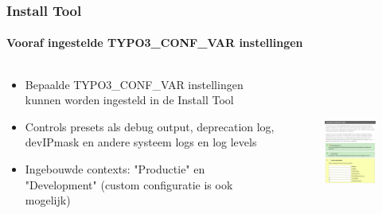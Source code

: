 \begin{frame}[fragile]
	\frametitle{Install Tool}
	\framesubtitle{Vooraf ingestelde TYPO3\_CONF\_VAR instellingen}

	\begin{columns}[T]
		\begin{column}{.5\textwidth}

			\begin{itemize}
				\item Bepaalde TYPO3\_CONF\_VAR instellingen kunnen worden ingesteld in de Install Tool
				\item Controls presets als debug output, deprecation log, devIPmask en andere systeem logs en log levels
				\item Ingebouwde contexts: "Productie" en "Development"\newline
					(custom configuratie is ook mogelijk)
			\end{itemize}

		\end{column}
		\begin{column}{.5\textwidth}

			\begin{figure}\vspace*{-0.4cm}
				\includegraphics[width=5cm,height=5cm]{Images/InstallTool/ApplicationContext.png}
			\end{figure}

		\end{column}
	\end{columns}

\end{frame}



